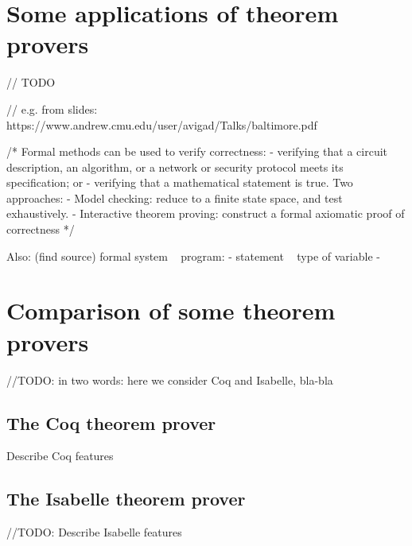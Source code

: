 \documentclass[article]{aaltoseries}
\begin{document}


\section{Some applications of theorem provers}
\label{sec:applications}

// TODO 

// e.g. from slides: https://www.andrew.cmu.edu/user/avigad/Talks/baltimore.pdf

/* Formal methods can be used to verify correctness:
- verifying that a circuit description, an algorithm, or a network or security protocol meets its specification; or
- verifying that a mathematical statement is true.
Two approaches:
- Model checking: reduce to a finite state space, and test exhaustively.
- Interactive theorem proving: construct a formal axiomatic proof of correctness
*/

Also: (find source) formal system ~ program:
- statement ~ type of variable
- 


\section{Comparison of some theorem provers}
\label{sec:comparison}

//TODO: in two words: here we consider Coq and Isabelle, bla-bla


\subsection{The Coq theorem prover}
\label{sec:prover_coq}

Describe Coq features


\subsection{The Isabelle theorem prover}
\label{sec:prover_isabelle}

//TODO: Describe Isabelle features

\end{document}
